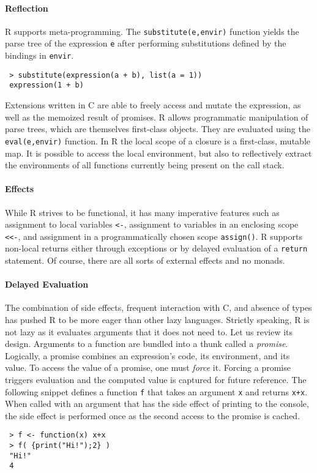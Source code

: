 \documentclass[review,creen,acmsmall]{acmart}
\newcommand{\code}[1]{\lstinline |#1|\xspace}
\begin{document}
\paragraph{Reflection}
R supports meta-programming. The \code{substitute(e,envir)}
function yields the parse tree of the expression \code{e} after performing
substitutions defined by the bindings in \code{envir}.
\vspace{-1mm}
\begin{lstlisting}
 > substitute(expression(a + b), list(a = 1))
 expression(1 + b)
\end{lstlisting}
\noindent
Extensions written in C are able to freely access and mutate the expression, as
well as the memoized result of promises. R allows programmatic manipulation of
parse trees, which are themselves first-class objects. They are evaluated using
the \code{eval(e,envir)} function. In R the local scope of a closure is a
first-class, mutable map. It is possible to access the local environment, but
also to reflectively extract the environments of all functions currently being
present on the call stack.

\paragraph{Effects} While R strives to be functional, it has many imperative
features such as assignment to local variables \code{<-}, assignment to
variables in an enclosing scope \code{<<-}, and assignment in a programmatically
chosen scope \code{assign()}. R supports non-local returns either through
exceptions or by delayed evaluation of a \code{return} statement. Of course,
there are all sorts of external effects and no monads.

\paragraph{Delayed Evaluation}

The combination of side effects, frequent interaction with C, and absence of
types has pushed R to be more eager than other lazy languages. Strictly
speaking, R is not lazy as it evaluates arguments that it does not need to. Let
us review its design. Arguments to a function are bundled into a thunk called a
\emph{promise}. Logically, a promise combines an expression's code, its
environment, and its value. To access the value of a promise, one must
\emph{force} it. Forcing a promise triggers evaluation and the computed value is
captured for future reference. The following snippet defines a function \code{f}
that takes an argument \code x and returns \code{x+x}. When called with an argument
that has the side effect of printing to the console, the side effect is
performed once as the second access to the promise is cached.
\begin{lstlisting}
 > f <- function(x) x+x
 > f( {print("Hi!");2} )
 "Hi!"
 4
\end{lstlisting}
\end{document}
